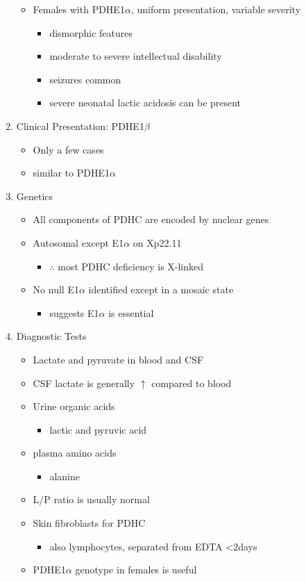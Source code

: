 \documentclass{scrartcl}
\begin{document}
\begin{enumerate}
\begin{itemize}
\item Females with PDHE1\(\alpha\), uniform presentation, variable severity
\begin{itemize}
\item dismorphic features
\item moderate to severe intellectual disability
\item seizures common
\item severe neonatal lactic acidosis can be present
\end{itemize}
\end{itemize}

\item Clinical Presentation: PDHE1\(\beta\)
\label{sec:org0d8ff0f}
\begin{itemize}
\item Only a few cases
\item similar to PDHE1\(\alpha\)
\end{itemize}

\item Genetics
\label{sec:org26e1175}
\begin{itemize}
\item All components of PDHC are encoded by nuclear genes
\item Autosomal except E1\(\alpha\) on Xp22.11
\begin{itemize}
\item \(\therefore\) most PDHC deficiency is X-linked
\end{itemize}
\item No null E1\(\alpha\) identified except in a mosaic state
\begin{itemize}
\item suggests E1\(\alpha\) is essential
\end{itemize}
\end{itemize}

\item Diagnostic Tests
\label{sec:org40a5467}
\begin{itemize}
\item Lactate and pyruvate in blood and CSF
\item CSF lactate is generally \(\uparrow\) compared to blood
\item Urine organic acids
\begin{itemize}
\item lactic and pyruvic acid
\end{itemize}
\item plasma amino acids
\begin{itemize}
\item alanine
\end{itemize}
\item L/P ratio is usually normal
\item Skin fibroblasts for PDHC
\begin{itemize}
\item also lymphocytes, separated from EDTA <2days
\end{itemize}
\item PDHE1\(\alpha\) genotype in females is useful
\end{itemize}


\end{enumerate}
\end{document}
